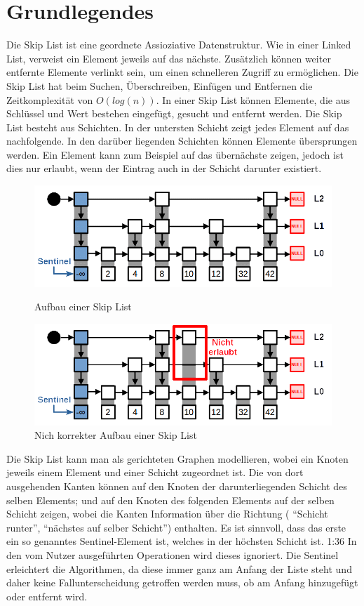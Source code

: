 \documentclass{TUBAFarbeiten}
\begin{document}
\section{Grundlegendes}
Die Skip List ist eine geordnete Assioziative \cite{itvis} Datenstruktur.  Wie in einer Linked List, verweist ein Element jeweils auf das nächste. Zusätzlich können weiter entfernte Elemente verlinkt sein, um einen schnelleren Zugriff zu ermöglichen. Die Skip List hat beim Suchen, Überschreiben, Einfügen und Entfernen die Zeitkomplexität von
 \(O(log(n))\).
In einer Skip List können Elemente, die aus Schlüssel und Wert bestehen eingefügt, gesucht und entfernt werden. 
Die Skip List besteht aus Schichten. In der untersten Schicht zeigt jedes Element auf das nachfolgende. In den darüber liegenden Schichten können Elemente übersprungen werden. Ein Element kann zum Beispiel auf das übernächste zeigen, jedoch ist dies nur erlaubt, wenn der Eintrag auch in der Schicht darunter existiert.
\begin{figure}
\includegraphics[scale=0.3]{img/aufbau1}
\caption{Aufbau einer Skip List}
\label{fig:Img1}
\includegraphics[scale=0.3]{img/aufbau1_falsch}
\caption{Nich korrekter Aufbau einer Skip List}
\label{fig:Img2}
\end{figure}
Die Skip List kann man als gerichteten Graphen modellieren, wobei ein Knoten jeweils einem Element und einer Schicht zugeordnet ist. Die von dort ausgehenden Kanten können auf den Knoten der darunterliegenden Schicht des selben Elements; und auf den Knoten des folgenden Elements auf der selben Schicht zeigen, wobei die Kanten Information über die Richtung ( "`Schicht runter"', "`nächstes auf selber Schicht"') enthalten. Es ist sinnvoll, dass das erste ein so genanntes Sentinel-Element ist, welches in der höchsten Schicht ist. \cite{suswang}1:36 In den vom Nutzer ausgeführten Operationen wird dieses ignoriert. Die Sentinel erleichtert die Algorithmen, da diese immer ganz am Anfang der Liste steht und daher keine Fallunterscheidung getroffen werden muss, ob am Anfang hinzugefügt oder entfernt wird. 
\end{document}
